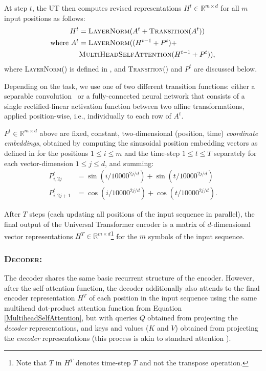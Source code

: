 At step $t$, the UT then computes revised representations $H^t \in \mathbb{R}^{m \times d}$ for all $m$ input positions as follows:
\begin{align}
    \label{RecurrentTransition}
    H^t &= \textsc{LayerNorm}(A^{t} + \textsc{Transition}(A^t) ) \\
    \mathrm{where}~A^t &= \textsc{LayerNorm}((H^{t-1} + P^{t}) + \\ 
    &  \textsc{MultiHeadSelfAttention}(H^{t-1} + P^{t})),
\end{align}
where \textsc{LayerNorm()} is defined in \cite{layernorm2016}, and \textsc{Transition()} and $P^t$ are discussed below.

Depending on the task, we use one of two different transition functions: either a separable convolution~\citep{xception2016} or a fully-connected neural network that consists of a single rectified-linear activation function between two affine transformations, applied position-wise, i.e., individually to each row of $A^t$.

$P^t \in \mathbb{R}^{m \times d}$ above are fixed, constant, two-dimensional (position, time) \emph{coordinate embeddings}, obtained by computing the sinusoidal position embedding vectors as defined in \citep{transformer} for the positions $1 \leq i \leq m$ and the time-step $1 \leq t \leq T$ separately for each vector-dimension $1 \leq j \leq d$, and summing:
\begin{align}
\label{eqn:coordinate-embeddings}
    P^t_{i, 2j} &= \sin(i / 10000^{2j / d}) + \sin(t / 10000^{2j / d}) \\
    P^t_{i, 2j+1} &= \cos(i / 10000^{2j / d}) + \cos(t / 10000^{2j / d}).
\end{align}

After $T$ steps (each updating all positions of the input sequence in parallel), the final output of the Universal Transformer encoder is a matrix of $d$-dimensional vector representations $H^T \in \mathbb{R}^{m \times d}$\footnote{Note that $T$ in $H^T$ denotes time-step $T$ and not the transpose operation.} for the $m$ symbols of the input sequence.

\subsubsection{\textsc{Decoder:}}
The decoder shares the same basic recurrent structure of the encoder. However, after the self-attention function, the decoder additionally also attends to the final encoder representation $H^T$ of each position in the input sequence using the same multihead dot-product attention function from Equation \ref{MultiheadSelfAttention}, but with queries $Q$ obtained from projecting the \emph{decoder} representations, and keys and values ($K$ and $V$) obtained from projecting the \emph{encoder} representations (this process is akin to standard attention \citep{bahdanau2014neural}).

